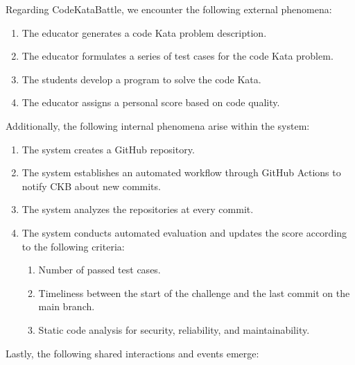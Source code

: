 \documentclass[12pt, a4paper]{report}
\begin{document}
    Regarding CodeKataBattle, we encounter the following external phenomena: 
    \begin{enumerate}
        \item The educator generates a code Kata problem description.
        \item The educator formulates a series of test cases for the code Kata problem.
        \item The students develop a program to solve the code Kata.
        \item The educator assigns a personal score based on code quality.
    \end{enumerate}
    Additionally, the following internal phenomena arise within the system: 
    \begin{enumerate}
        \item The system creates a GitHub repository.
        \item The system establishes an automated workflow through GitHub Actions to notify CKB about new commits.
        \item The system analyzes the repositories at every commit.
        \item The system conducts automated evaluation and updates the score according to the following criteria:
            \begin{enumerate}
                \item Number of passed test cases.
                \item Timeliness between the start of the challenge and the last commit on the main branch.
                \item Static code analysis for security, reliability, and maintainability.
            \end{enumerate}
    \end{enumerate}    
    Lastly, the following shared interactions and events emerge:
\end{document}
